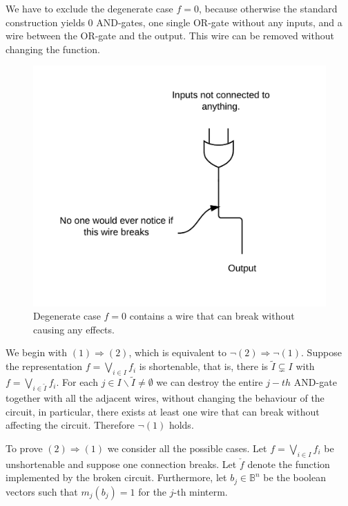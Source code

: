 \documentclass[10pt,a4paper]{scrartcl}
\begin{document}
 We have to exclude the degenerate case $f=0$, because otherwise the
standard construction yields $0$ AND-gates, one single OR-gate without any inputs, and a wire
between the OR-gate and the output. This wire can be removed without changing the function.
\begin{figure}
  \centering\includegraphics[width=0.4\linewidth]{images/exercise_6_2_degenerate.png}
  \caption{ Degenerate case $f=0$ contains a wire that can break without causing any effects.}
\end{figure}
\FloatBarrier

 We begin with $(1) \Rightarrow (2)$, which is equivalent to
$\neg(2) \Rightarrow \neg(1)$. Suppose the representation $f = \bigvee_{i \in I} f_i$ is
shortenable, that is, there is $\tilde I \subsetneq I$ with 
$f = \bigvee_{i \in \tilde I} f_i$. For each $j \in I \backslash \tilde I \neq \emptyset$ we can destroy
the entire $j-th$ AND-gate together with all the adjacent wires, without changing the 
behaviour of the circuit, in particular, there exists at least one wire that can break without affecting
the circuit. Therefore $\neg (1)$ holds.

To prove $(2) \Rightarrow (1)$ we consider all the possible cases. Let $f = \bigvee_{i \in I} f_i$ be
unshortenable and suppose one connection breaks. Let $\check f$ denote the function implemented by the
broken circuit. Furthermore, let $b_j\in \mathbb{B}^n$ be the boolean vectors such that $m_j(b_j) = 1$
for the $j$-th minterm.
\end{document}
